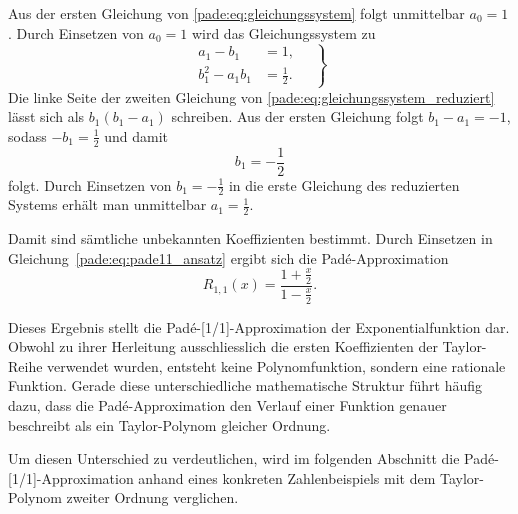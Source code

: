 Aus der ersten Gleichung
von \eqref{pade:eq:gleichungssystem}
folgt unmittelbar \(a_0=1\).
Durch Einsetzen von \(a_0=1\) wird das Gleichungssystem zu
\begin{equation}
	\left.
	\begin{aligned}
		a_1-b_1 &= 1,\\
		b_1^2-a_1b_1 &= \frac{1}{2}.
	\end{aligned}
	\quad\right\}
	\label{pade:eq:gleichungssystem_reduziert}
\end{equation}
Die linke Seite der zweiten Gleichung
von \eqref{pade:eq:gleichungssystem_reduziert}
lässt sich als \(b_1(b_1-a_1)\) schreiben. Aus der ersten Gleichung folgt \(b_1-a_1=-1\), sodass \(-b_1=\frac{1}{2}\) und damit
\begin{equation*}
	b_1=-\frac{1}{2}
\end{equation*}
folgt. Durch Einsetzen von \(b_1=-\frac{1}{2}\) in die erste Gleichung des reduzierten Systems erhält man unmittelbar \(a_1=\frac{1}{2}\).

Damit sind sämtliche unbekannten Koeffizienten bestimmt. Durch Einsetzen in Gleichung~\eqref{pade:eq:pade11_ansatz} ergibt sich die Padé-Approximation
\begin{equation*}
	R_{1,1}(x)
	=
	\frac{1+\frac{x}{2}}
	{1-\frac{x}{2}}.
\end{equation*}

Dieses Ergebnis stellt die Padé-[1/1]-Approximation der
Exponentialfunktion dar.
Obwohl zu ihrer Herleitung ausschliesslich die
ersten Koeffizienten der Taylor-Reihe verwendet wurden, entsteht keine
Polynomfunktion, sondern eine rationale Funktion.
Gerade diese unterschiedliche mathematische Struktur führt häufig dazu,
dass die Padé-Appro\-xi\-ma\-tion den Verlauf einer Funktion genauer beschreibt
als ein Taylor-Polynom gleicher Ordnung.

Um diesen Unterschied zu verdeutlichen, wird im folgenden Abschnitt die Padé-[1/1]-Approximation anhand eines konkreten Zahlenbeispiels mit dem Taylor-Polynom zweiter Ordnung verglichen.
